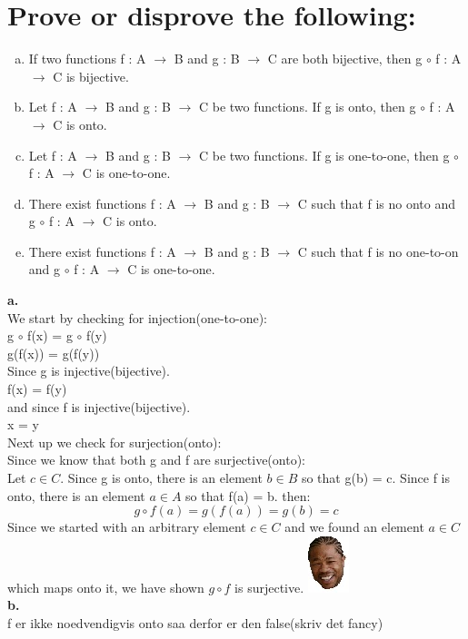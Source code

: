 \section{Prove or disprove the following:}
\begin{enumerate}[a.]
\item If two functions f : A $\rightarrow$ B and g : B $\rightarrow$ C are both bijective, then g $\circ$ f : A $\rightarrow$ C is bijective.
\item Let f : A $\rightarrow$ B and g : B $\rightarrow$ C be two functions. If g is onto, then g $\circ$ f : A $\rightarrow$ C is onto.
\item Let f : A $\rightarrow$ B and g : B $\rightarrow$ C be two functions. If g is one-to-one, then g $\circ$ f : A $\rightarrow$ C is one-to-one.
\item There exist functions f : A $\rightarrow$ B and g : B $\rightarrow$ C such that f is no onto and g $\circ$ f : A $\rightarrow$ C is onto.
\item There exist functions f : A $\rightarrow$ B and g : B $\rightarrow$ C such that f is no one-to-on and g $\circ$ f : A $\rightarrow$ C is one-to-one.
\end{enumerate}
\textbf{a.}\\
We start by checking for injection(one-to-one):\\
g $\circ$ f(x) = g $\circ$ f(y)\\
g(f(x)) = g(f(y))\\
Since g is injective(bijective).\\
f(x) = f(y)\\
and since f is injective(bijective).\\
x = y\\
Next up we check for surjection(onto):\\
Since we know that both g and f are surjective(onto):\\
Let $c \in C$. Since g is onto, there is an element $b \in B$ so that g(b) = c. Since f is onto, there is an element $a \in A$ so that f(a) = b. then:\\
\begin{equation}
g \circ f(a) = g(f(a)) = g(b) = c
\end{equation}
Since we started with an arbitrary element $c \in C$ and we found an element $a \in C$ which maps onto it, we have shown $g \circ f$ is surjective. \includegraphics[scale=0.70]{billeder/xzibit}\\
\textbf{b.}\\
f er ikke noedvendigvis onto saa derfor er den false(skriv det fancy)


